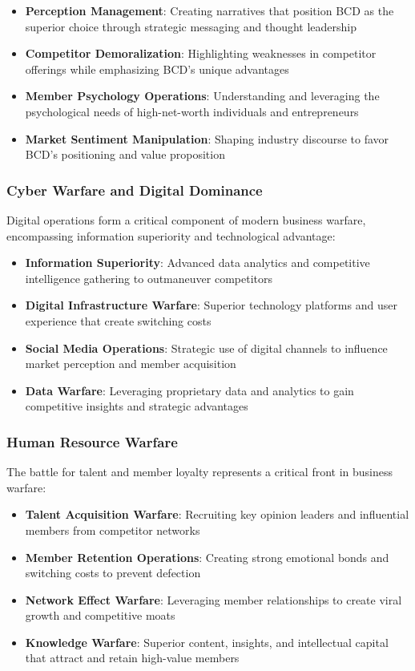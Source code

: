 \begin{itemize}
    \item \textbf{Perception Management}: Creating narratives that position BCD as the superior choice through strategic messaging and thought leadership
    \item \textbf{Competitor Demoralization}: Highlighting weaknesses in competitor offerings while emphasizing BCD's unique advantages
    \item \textbf{Member Psychology Operations}: Understanding and leveraging the psychological needs of high-net-worth individuals and entrepreneurs
    \item \textbf{Market Sentiment Manipulation}: Shaping industry discourse to favor BCD's positioning and value proposition
\end{itemize}

\subsubsection{Cyber Warfare and Digital Dominance}

Digital operations form a critical component of modern business warfare, encompassing information superiority and technological advantage:

\begin{itemize}
    \item \textbf{Information Superiority}: Advanced data analytics and competitive intelligence gathering to outmaneuver competitors
    \item \textbf{Digital Infrastructure Warfare}: Superior technology platforms and user experience that create switching costs
    \item \textbf{Social Media Operations}: Strategic use of digital channels to influence market perception and member acquisition
    \item \textbf{Data Warfare}: Leveraging proprietary data and analytics to gain competitive insights and strategic advantages
\end{itemize}

\subsubsection{Human Resource Warfare}

The battle for talent and member loyalty represents a critical front in business warfare:

\begin{itemize}
    \item \textbf{Talent Acquisition Warfare}: Recruiting key opinion leaders and influential members from competitor networks
    \item \textbf{Member Retention Operations}: Creating strong emotional bonds and switching costs to prevent defection
    \item \textbf{Network Effect Warfare}: Leveraging member relationships to create viral growth and competitive moats
    \item \textbf{Knowledge Warfare}: Superior content, insights, and intellectual capital that attract and retain high-value members
\end{itemize}

